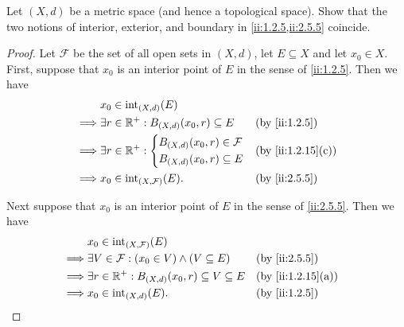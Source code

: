 \begin{ex}\label{ii:ex:2.5.3}
  Let \((X, d)\) be a metric space (and hence a topological space).
  Show that the two notions of interior, exterior, and boundary in \cref{ii:1.2.5,ii:2.5.5} coincide.
\end{ex}

\begin{proof}
  Let \(\mathcal{F}\) be the set of all open sets in \((X, d)\), let \(E \subseteq X\) and let \(x_0 \in X\).
  First, suppose that \(x_0\) is an interior point of \(E\) in the sense of \cref{ii:1.2.5}.
  Then we have
  \begin{align*}
             & x_0 \in \text{int}_{(X, d)}(E)                                         \\
    \implies & \exists r \in \R^+ : B_{(X, d)}(x_0, r) \subseteq E &  & \by{ii:1.2.5} \\
    \implies & \exists r \in \R^+ : \begin{dcases}
                                      B_{(X, d)}(x_0, r) \in \mathcal{F} \\
                                      B_{(X, d)}(x_0, r) \subseteq E
                                    \end{dcases}               &  & \by{ii:1.2.15}[c] \\
    \implies & x_0 \in \text{int}_{(X, \mathcal{F})}(E).           &  & \by{ii:2.5.5}
  \end{align*}

  Next suppose that \(x_0\) is an interior point of \(E\) in the sense of \cref{ii:2.5.5}.
  Then we have
  \begin{align*}
             & x_0 \in \text{int}_{(X, \mathcal{F})}(E)                                               \\
    \implies & \exists V \in \mathcal{F} : (x_0 \in V) \land (V \subseteq E)   &  & \by{ii:2.5.5}     \\
    \implies & \exists r \in \R^+ : B_{(X, d)}(x_0, r) \subseteq V \subseteq E &  & \by{ii:1.2.15}[a] \\
    \implies & x_0 \in \text{int}_{(X, d)}(E).                                 &  & \by{ii:1.2.5}
  \end{align*}


\end{proof}

